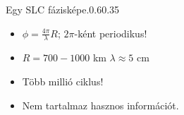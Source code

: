 \begin{frame}{\ft}
    \begin{figp}{}{Egy SLC fázisképe.}{0.6}{0.35}
        \begin{itemize}
            \item $\phi = \frac{4\pi}{\lambda}R$; $2\pi$-ként periodikus!
            \item $R = 700-1000 $ km \hspace{10pt} $\lambda \approx 5$ cm
            \item Több millió ciklus!
            \item Nem tartalmaz hasznos információt.
        \end{itemize}
    \end{figp}
\end{frame}
